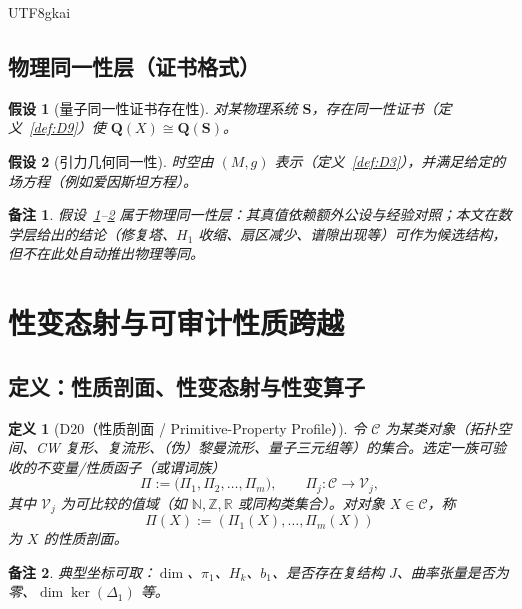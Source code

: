 \documentclass[12pt]{article}
\newtheorem{definition}{定义}[section]
\newtheorem{assumption}{假设}[section]
\newtheorem{remark}{备注}[section]
\begin{document}
\begin{CJK*}{UTF8}{gkai}
\subsection{物理同一性层（证书格式）}

\begin{assumption}[量子同一性证书存在性]
\label{ass:A4}
对某物理系统 $\mathbf S$，存在同一性证书（定义~\ref{def:D9}）使 $\mathbf Q(X)\cong \mathbf Q(\mathbf S)$。
\end{assumption}

\begin{assumption}[引力几何同一性]
\label{ass:A5}
时空由 $(M,g)$ 表示（定义~\ref{def:D3}），并满足给定的场方程（例如爱因斯坦方程）。
\end{assumption}

\begin{remark}
\label{rem:boundary}
假设~\ref{ass:A4}--\ref{ass:A5} 属于物理同一性层：其真值依赖额外公设与经验对照；本文在数学层给出的结论（修复塔、$H_1$ 收缩、扇区减少、谱隙出现等）可作为候选结构，但不在此处自动推出物理等同。
\end{remark}

\clearpage
\section{性变态射与可审计性质跨越}
\label{sec:metamorphism}

\subsection{定义：性质剖面、性变态射与性变算子}

\begin{definition}[D20（性质剖面 / Primitive-Property Profile）]
\label{def:D20}
令 $\mathcal C$ 为某类对象（拓扑空间、CW 复形、复流形、（伪）黎曼流形、量子三元组等）的集合。选定一族可验收的不变量/性质函子（或谓词族）
\[
\Pi:=\big(\Pi_1,\Pi_2,\dots,\Pi_m\big),
\qquad
\Pi_j:\mathcal C\to \mathcal V_j,
\]
其中 $\mathcal V_j$ 为可比较的值域（如 $\mathbb N,\mathbb Z,\mathbb R$ 或同构类集合）。对对象 $X\in\mathcal C$，称
\[
\Pi(X):=(\Pi_1(X),\dots,\Pi_m(X))
\]
为 $X$ 的\emph{性质剖面}。
\end{definition}

\begin{remark}
典型坐标可取：$\dim$、$\pi_1$、$H_k$、$b_1$、是否存在复结构 $J$、曲率张量是否为零、$\dim\ker(\Delta_1)$ 等。
\end{remark}


\end{CJK*}
\end{document}
